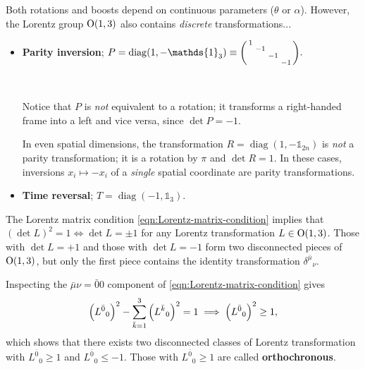 Both rotations and boosts depend on continuous parameters ($\theta$ or $\alpha$).
However, the Lorentz group $\mathrm{O}(1,3)$ also contains \emph{discrete} transformations...
\begin{itemize}

	\item \textbf{Parity inversion};
	\begin{math}
		P = \operatorname{diag}(1, -\mathds{1}_3) \equiv
		\smqty(1 & & & \\ & -1 & & \\ & & -1 & \\ & & & -1)
	.\end{math}

	{\centering
		
	\\}
	Notice that $P$ is \textit{not} equivalent to a rotation; it transforms a right-handed frame into a left and vice versa, since $\det P = -1$.

	\begin{note}
	In even spatial dimensions, the transformation $R = \operatorname{diag}(1, -\mathds{1}_{2n})$ is \textit{not} a parity transformation; it is a rotation by $\pi$ and $\det R = 1$.
	In these cases, inversions $x_i \mapsto -x_i$ of a \textit{single} spatial coordinate are parity transformations.
	\end{note}

	\item \textbf{Time reversal};
	\begin{math}
		T = \operatorname{diag}(-1, \mathds{1}_3)
	.\end{math}
\end{itemize}

The Lorentz matrix condition \eqref{eqn:Lorentz-matrix-condition} implies that $(\det L)^2 = 1 \iff \det L = \pm 1$ for any Lorentz transformation $L \in \mathrm{O}(1,3)$.
Those with $\det L = +1$ and those with $\det L = -1$ form two disconnected pieces of $\mathrm{O}(1,3)$, but only the first piece contains the identity transformation $\delta^{\bar\mu}{}_\nu$.

Inspecting the $\bar\mu\nu = \bar00$ component of \eqref{eqn:Lorentz-matrix-condition} gives
\begin{align}
	\qty(L^{\bar0}{}_0)^2 - \sum_{\bar k = 1}^3\qty(L^{\bar k}{}_0)^2 = 1
	\implies
	\qty(L^{\bar0}{}_0)^2 \ge 1
,\end{align}
which shows that there exists two disconnected classes of Lorentz transformation with $L^{\bar0}{}_0 \ge 1$ and $L^{\bar0}{}_0 \le -1$.
Those with $L^{\bar0}{}_0 \ge 1$ are called \textbf{orthochronous}.

